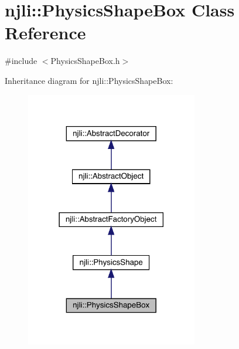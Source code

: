 \hypertarget{classnjli_1_1_physics_shape_box}{}\section{njli\+:\+:Physics\+Shape\+Box Class Reference}
\label{classnjli_1_1_physics_shape_box}


{\ttfamily \#include $<$Physics\+Shape\+Box.\+h$>$}



Inheritance diagram for njli\+:\+:Physics\+Shape\+Box\+:\nopagebreak
\begin{figure}[H]
\begin{center}
\leavevmode
\includegraphics[width=213pt]{classnjli_1_1_physics_shape_box__inherit__graph}
\end{center}
\end{figure}


